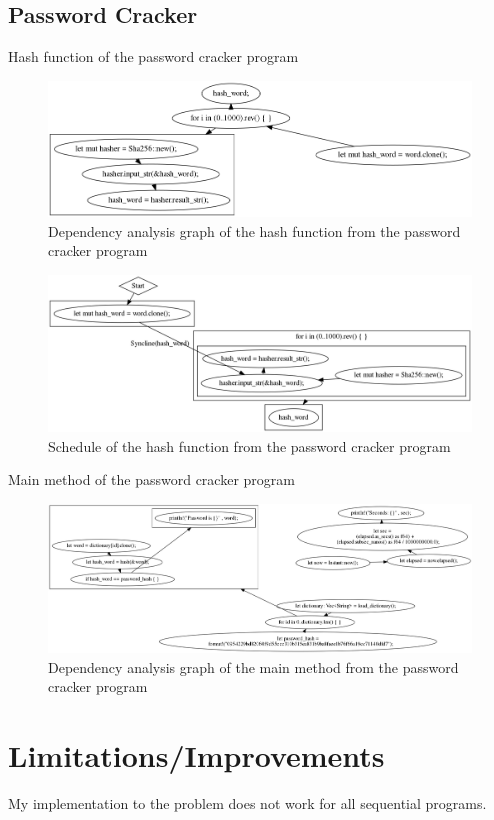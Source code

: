 \subsection{Password Cracker}

\begin{code}
    \caption{Hash function of the password cracker program}
\end{code}

\begin{figure}[H]
    \centering
    \includegraphics[width=\textwidth]{img/password-cracker/hash-dependency-analysis.png}
    \caption{Dependency analysis graph of the hash function from the password cracker program}
\end{figure}

\begin{figure}[H]
    \centering
    \includegraphics[width=\textwidth]{img/password-cracker/hash-schedule.png}
    \caption{Schedule of the hash function from the password cracker program}
\end{figure}

\begin{code}
    \caption{Main method of the password cracker program}
\end{code}

\begin{figure}[H]
    \centering
    \includegraphics[width=\textwidth]{img/password-cracker/main-dependency-analysis.png}
    \caption{Dependency analysis graph of the main method from the password cracker program}
\end{figure}



\section{Limitations/Improvements}
My implementation to the problem does not work for all sequential programs.
